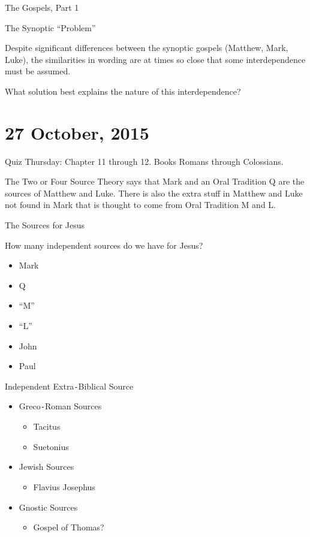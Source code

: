 \documentclass{article}
\begin{document}
    \centerline{The Gospels, Part 1}

    The Synoptic ``Problem''

    Despite significant differences between the synoptic gospels (Matthew, Mark, Luke), the similarities in wording are at times so close that some interdependence must be assumed.

    What solution best explains the nature of this interdependence?

    \section{27 October, 2015}

    Quiz Thursday: Chapter 11 through 12. Books Romans through Colossians.

    The Two or Four Source Theory says that Mark and an Oral Tradition Q are the sources of Matthew and Luke. There is also the extra stuff in Matthew and Luke not found in Mark that is thought to come from Oral Tradition M and L.

    \centerline{The Sources for Jesus}

    How many independent sources do we have for Jesus?

    \begin{itemize}
        \item Mark
        \item Q
        \item ``M''
        \item ``L''
        \item John
        \item Paul
    \end{itemize}

    Independent Extra\texttt{-}Biblical Source
    \begin{itemize}
        \item Greco\texttt{-}Roman Sources\\
            \begin{itemize}
                \item Tacitus
                \item Suetonius
            \end{itemize}
        \item Jewish Sources\\
            \begin{itemize}
                \item Flavius Josephus
            \end{itemize}
        \item Gnostic Sources\\
            \begin{itemize}
                \item Gospel of Thomas?
            \end{itemize}
    \end{itemize}
\end{document}

